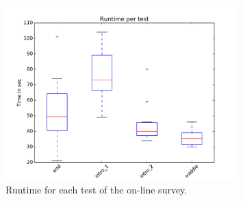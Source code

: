 \begin{appendices}
\begin{figure}
\caption{Runtime for each test of the on-line survey.}
\label{fig_app:survey_runtime}
\centering
\includegraphics[width=0.8\textwidth]{Figures/survey_runtime.pdf}
\end{figure}

\cleardoublepage

\end{appendices}

